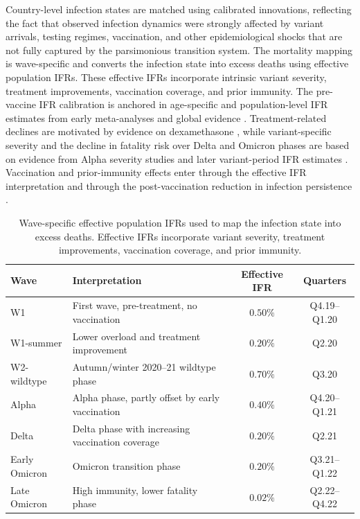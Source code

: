 \documentclass[12pt, a4paper]{article}
\begin{document}
Country-level infection states are matched using calibrated innovations, reflecting the fact that observed infection dynamics were strongly affected by variant arrivals, testing regimes, vaccination, and other epidemiological shocks that are not fully captured by the parsimonious transition system. The mortality mapping is wave-specific and converts the infection state into excess deaths using effective population IFRs. These effective IFRs incorporate intrinsic variant severity, treatment improvements, vaccination coverage, and prior immunity. The pre-vaccine IFR calibration is anchored in age-specific and population-level IFR estimates from early meta-analyses and global evidence \citep{levin2020assessing,meyerowitzkatz2020systematic,brazeau2020infection,covidforecasting2022variation}. Treatment-related declines are motivated by evidence on dexamethasone \citep{recovery2021dexamethasone}, while variant-specific severity and the decline in fatality risk over Delta and Omicron phases are based on evidence from Alpha severity studies and later variant-period IFR estimates \citep{davies2021increased,marziano2023estimating,ward2024realtime,erikstrup2022seroprevalence}. Vaccination and prior-immunity effects enter through the effective IFR interpretation and through the post-vaccination reduction in infection persistence \citep{degier2021vaccine}.

\begin{table}[H]
\centering
\captionsetup{font=scriptsize}
\caption{Wave-specific effective population IFRs used to map the infection state into excess deaths. Effective IFRs incorporate variant severity, treatment improvements, vaccination coverage, and prior immunity.}
\label{tab:ifr_waves}
\scriptsize
\begin{tabular}{llcc}
\toprule
\textbf{Wave} & \textbf{Interpretation} & \textbf{Effective IFR} & \textbf{Quarters} \\
\midrule
W1 & First wave, pre-treatment, no vaccination & $0.50\%$ & Q4.19--Q1.20 \\
W1-summer & Lower overload and treatment improvement & $0.20\%$ & Q2.20 \\
W2-wildtype & Autumn/winter 2020--21 wildtype phase & $0.70\%$ & Q3.20 \\
Alpha & Alpha phase, partly offset by early vaccination & $0.40\%$ & Q4.20--Q1.21 \\
Delta & Delta phase with increasing vaccination coverage & $0.20\%$ & Q2.21 \\
Early Omicron & Omicron transition phase & $0.20\%$ & Q3.21--Q1.22 \\
Late Omicron & High immunity, lower fatality phase & $0.02\%$ & Q2.22--Q4.22 \\
\bottomrule
\end{tabular}
\end{table}
\end{document}
